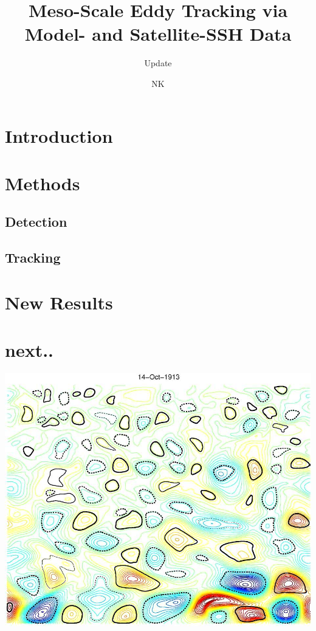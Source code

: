 \documentclass{beamer}
\begin{document}
\title{Meso-Scale Eddy Tracking via Model- and Satellite-SSH Data}
\subtitle{Update}
\author{NK}
%
\section{Introduction}

\section{Methods}
\subsection{Detection}

\subsection{Tracking}

\section{New Results}

\section{next..}


\begin{frame}
\begin{center}
\centering
\href{run:mplayer -fs ./MOViq55RoL4MadShort.avi}{
\includegraphics[scale=0.25]
{MOViq55RoL4MadShort.jpeg}}
\end{center}
\end{frame}
\end{document}
